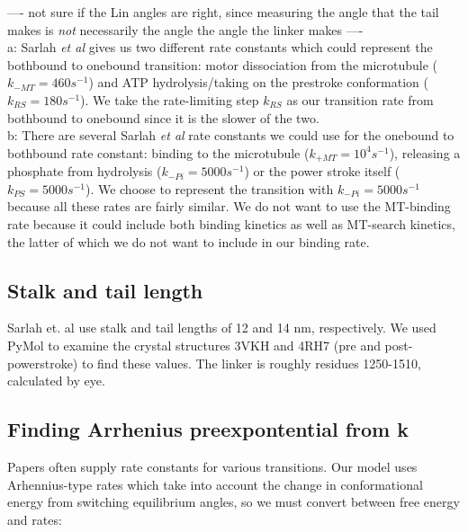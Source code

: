 \documentclass[10pt]{article} %
\begin{document}
---- not sure if the Lin angles are right, since measuring the angle that the tail makes is \textit{not} necessarily the angle the angle the linker makes ----\\

a: Sarlah \textit{et al} gives us two different rate constants which could represent the bothbound to onebound transition: motor dissociation from the microtubule ($k_{-MT} = 460 s^{-1}$) and ATP hydrolysis/taking on the prestroke conformation ($k_{RS} = 180 s^{-1}$). We take the rate-limiting step $k_{RS}$ as our transition rate from bothbound to onebound since it is the slower of the two.\\

b: There are several Sarlah \textit{et al} rate constants we could use for the onebound to bothbound rate constant: binding to the microtubule ($k_{+MT} = 10^4 s^{-1}$), releasing a phosphate from hydrolysis ($k_{-Pi} = 5000 s^{-1}$) or the power stroke itself ($k_{PS} = 5000 s^{-1}$). We choose to represent the transition with $k_{-Pi} = 5000 s^{-1}$ because all these rates are fairly similar. We do not want to use the MT-binding rate because it could include both binding kinetics as well as MT-search kinetics, the latter of which we do not want to include in our binding rate.\\

\subsection{Stalk and tail length}
Sarlah et. al use stalk and tail lengths of 12 and 14 nm, respectively. We used PyMol to examine the crystal structures 3VKH and 4RH7 (pre and post-powerstroke) to find these values. The linker is roughly residues 1250-1510, calculated by eye.\\

\subsection{Finding Arrhenius preexpontential from k}
Papers often supply rate constants for various transitions. Our model uses Arhennius-type rates which take into account the change in conformational energy from switching equilibrium angles, so we must convert between free energy and rates:
\end{document}
